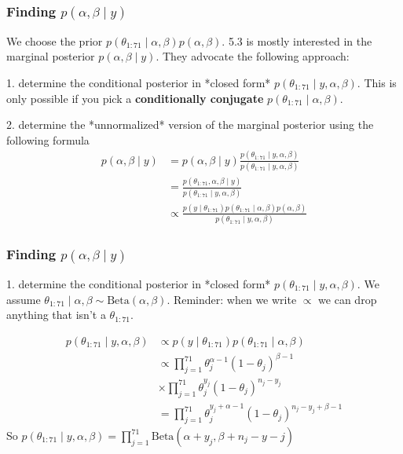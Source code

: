 \documentclass{beamer}
\begin{document}
\begin{frame}
\frametitle{Finding $p(\alpha,\beta \mid y)$ }

We choose the prior $p(\theta_{1:71} \mid \alpha, \beta)p(\alpha, \beta)$. 5.3 is mostly interested in the marginal posterior $p(\alpha, \beta \mid y)$. They advocate the following approach:
\newline

1. determine the conditional posterior in *closed form* $p(\theta_{1:71} \mid y, \alpha, \beta)$. This is only possible if you pick a {\bf conditionally conjugate} $p(\theta_{1:71} \mid \alpha, \beta)$.
\newline
\pause

2. determine the *unnormalized* version of the marginal posterior using the following formula
\begin{align*}
p(\alpha, \beta \mid y) &= p(\alpha, \beta \mid y)\frac{p(\theta_{1:71} \mid y, \alpha, \beta) }{p(\theta_{1:71} \mid y, \alpha, \beta) } \\
&= \frac{p(\theta_{1:71}, \alpha, \beta  \mid y) }{p(\theta_{1:71} \mid y, \alpha, \beta) } \\
&\propto \frac{p(y \mid \theta_{1:71})p(\theta_{1:71} \mid \alpha, \beta)p(\alpha, \beta) }{p(\theta_{1:71} \mid y, \alpha, \beta) }
\end{align*}
\end{frame}


\begin{frame}
\frametitle{Finding $p(\alpha,\beta \mid y)$ }

1. determine the conditional posterior in *closed form* $p(\theta_{1:71} \mid y, \alpha, \beta)$. We assume $\theta_{1:71} \mid \alpha, \beta \sim \text{Beta}(\alpha,\beta)$. Reminder: when we write $\propto$ we can drop anything that isn't a $\theta_{1:71}$.

\begin{align*}
p(\theta_{1:71} \mid y, \alpha, \beta) &\propto p(y \mid \theta_{1:71})p(\theta_{1:71} \mid \alpha, \beta)\\
&\propto \prod_{j=1}^{71} \theta_j^{\alpha-1}(1-\theta_j)^{\beta-1} \\
&\times \prod_{j=1}^{71}\theta_j^{y_j}(1-\theta_j)^{n_j - y_j} \\
&= \prod_{j=1}^{71}\theta_j^{y_j+\alpha-1}(1-\theta_j)^{n_j - y_j + \beta-1}
\end{align*}
So $p(\theta_{1:71} \mid y, \alpha, \beta) = \prod_{j=1}^{71}\text{Beta}(\alpha + y_j, \beta + n_j - y-j)$


\end{frame}
\end{document}

